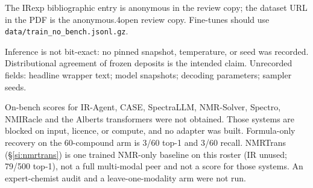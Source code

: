 \documentclass[11pt]{article}
\begin{document}
The IRexp bibliographic entry is anonymous in the review copy;
the dataset URL in the PDF is the anonymous.4open review copy.
Fine-tunes should use \texttt{data/train\_no\_bench.jsonl.gz}.

Inference is not bit-exact: no pinned snapshot, temperature, or seed
was recorded. Distributional agreement of frozen deposits is the
intended claim.
Unrecorded fields: headline wrapper text; model snapshots; decoding
parameters; sampler seeds.

On-bench scores for IR-Agent, CASE, SpectraLLM, NMR-Solver, Spectro,
NMIRacle and the Alberts transformers were not obtained.
Those systems are blocked on input, licence, or compute, and no adapter
was built.
Formula-only recovery on the 60-compound arm is 3/60 top-1 and 3/60 recall.
NMRTrans (\S\ref{si:nmrtrans}) is one trained NMR-only baseline on this
roster (IR unused; 79/500 top-1), not a full multi-modal peer and not a
score for those systems.
An expert-chemist audit and a leave-one-modality arm were not run.
\end{document}
